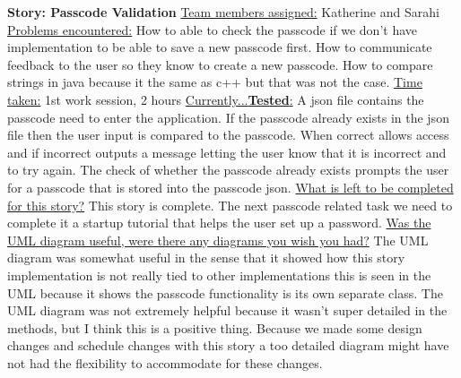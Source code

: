 \documentclass[letterpaper,12pt,titlepage]{article}
\begin{document}
\textbf{Story: Passcode Validation}
\newline
\newline
\underline{Team members assigned:}
Katherine and Sarahi
\newline
\underline{Problems encountered:}
How to able to check the passcode if we don’t have implementation to be able to save a new passcode first. How to communicate feedback to the user so they know to create a new passcode. How to compare strings in java because it the same as c++ but that was not the case.
\newline
\underline{Time taken:}
1st work session, 2 hours
\newline
\underline{Currently...\textbf{Tested}:}
A json file contains the passcode need to enter the application. If the passcode already exists in the json file then the user input is compared to the passcode. When correct allows access and if incorrect outputs a message letting the user know that it is incorrect and to try again. The check of whether the passcode already exists prompts the user for a passcode that is stored into the passcode json.
\newline
\underline{What is left to be completed for this story?}
This story is complete. The next passcode related task we need to complete it a startup tutorial that helps the user set up a password.
\newline
\underline{Was the UML diagram useful, were there any diagrams you wish you had?}
The UML diagram was somewhat useful in the sense that it showed how this story implementation is not really tied to other implementations this is seen in the UML because it shows the passcode functionality is its own separate class. The UML diagram was not extremely helpful because it wasn’t super detailed in the methods, but I think this is a positive thing. Because we made some design changes and schedule changes with this story a too detailed diagram might have not had the flexibility to accommodate for these changes.
\newline
\newline
\end{document}
